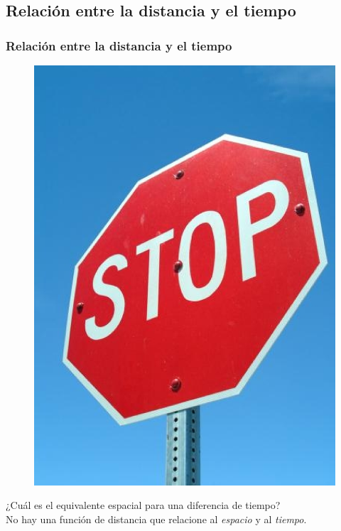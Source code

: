 \documentclass{beamer}
\begin{document}
\subsection{Relación entre la distancia y el tiempo}
\begin{frame}
\frametitle{Relación entre la distancia y el tiempo}
\begin{figure}
\includegraphics[scale=0.23]{image/stop.eps}
\end{figure}
¿Cuál es el equivalente espacial para una diferencia de tiempo?\\
No hay una función de distancia que relacione al \emph{espacio} y al \emph{tiempo}.
\end{frame}
\end{document}
